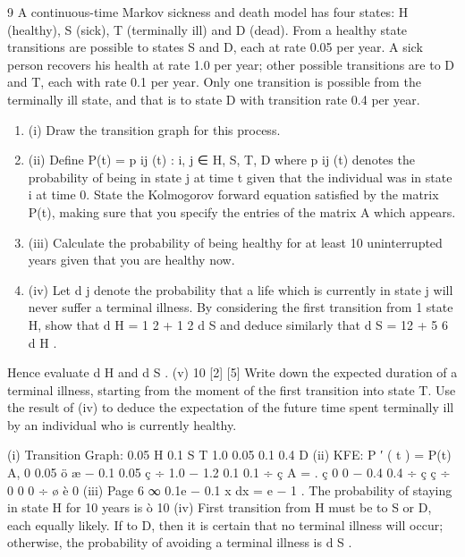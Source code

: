\documentclass[a4paper,12pt]{article}
\begin{document}
\begin{enumerate}
9
A continuous-time Markov sickness and death model has four states: H (healthy),
S (sick), T (terminally ill) and D (dead). From a healthy state transitions are possible to states S and D, each at rate 0.05 per year. A sick person recovers his health at rate 1.0 per year; other possible transitions are to D and T, each with
rate 0.1 per year. Only one transition is possible from the terminally ill state, and that is to state D with transition rate 0.4 per year.
\begin{enumerate}
\item (i) Draw the transition graph for this process.
\item (ii) Define P(t) = {p ij (t) : i, j ∈ H, S, T, D} where p ij (t) denotes the probability of being in state j at time t given that the individual was in state i at time 0.
State the Kolmogorov forward equation satisfied by the matrix P(t), making sure that you specify the entries of the matrix A which appears.

\item (iii) Calculate the probability of being healthy for at least 10 uninterrupted years given that you are healthy now.

\item (iv) Let d j denote the probability that a life which is currently in state j will never suffer a terminal illness. By considering the first transition from
1
state H, show that d H = 1 2 + 1 2 d S and deduce similarly that d S = 12
+ 5 6 d H .
\end{enumerate}
Hence evaluate d H and d S .
(v)
10
[2]
[5]
Write down the expected duration of a terminal illness, starting from the moment of the first transition into state T. Use the result of (iv) to deduce
the expectation of the future time spent terminally ill by an individual
who is currently healthy.

(i)
Transition Graph:
0.05
H
0.1
S
T
1.0
0.05
0.1
0.4
D
(ii)
KFE: P ′ ( t ) = P(t) A,
0
0.05 ö
æ − 0.1 0.05
ç
÷
1.0 − 1.2 0.1 0.1 ÷
ç
A =
.
ç 0
0
− 0.4 0.4 ÷
ç ç
÷
0
0
0 ÷ ø
è 0
(iii)
Page 6
∞
0.1e − 0.1 x dx = e − 1 .
The probability of staying in state H for 10 years is ò 10
(iv)
First transition from H must be to S or D, each equally likely. If to D, then it is certain that no terminal illness will occur; otherwise, the probability
of avoiding a terminal illness is d S .


\end{enumerate}
\end{document}
